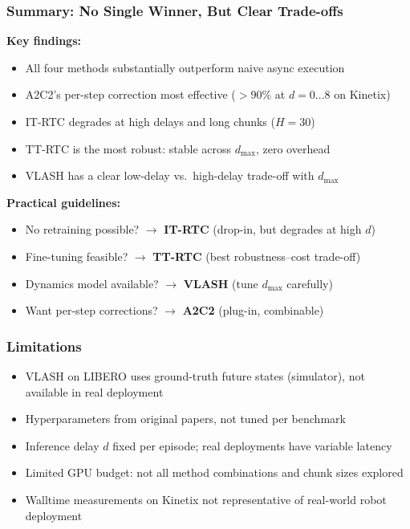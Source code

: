 \documentclass[aspectratio=1610]{beamer}
\begin{document}
\begin{frame}
\frametitle{Summary: No Single Winner, But Clear Trade-offs}

\textbf{Key findings:}
\begin{itemize}
    \item All four methods substantially outperform naive async execution
    \item A2C2's per-step correction most effective ($>$90\% at $d{=}0...8$ on Kinetix)
    \item IT-RTC degrades at high delays and long chunks ($H = 30$)
    \item TT-RTC is the most \alert{robust}: stable across $d_{\max}$, zero overhead
    \item VLASH has a clear low-delay vs.\ high-delay trade-off with $d_{\max}$
\end{itemize}

\vspace{0.5em}
\textbf{Practical guidelines:}
\begin{itemize}
    \item No retraining possible? $\rightarrow$ \textbf{IT-RTC} (drop-in, but degrades at high $d$)
    \item Fine-tuning feasible? $\rightarrow$ \textbf{TT-RTC} (best robustness--cost trade-off)
    \item Dynamics model available? $\rightarrow$ \textbf{VLASH} (tune $d_{\max}$ carefully)
    \item Want per-step corrections? $\rightarrow$ \textbf{A2C2} (plug-in, combinable)
\end{itemize}

\end{frame}

\begin{frame}
\frametitle{Limitations}

\begin{itemize}
    \item VLASH on LIBERO uses ground-truth future states (simulator), not available in real deployment
    \item Hyperparameters from original papers, not tuned per benchmark
    \item Inference delay $d$ fixed per episode; real deployments have variable latency
    \item Limited GPU budget: not all method combinations and chunk sizes explored
    \item Walltime measurements on Kinetix not representative of real-world robot deployment
\end{itemize}

\end{frame}
\end{document}
